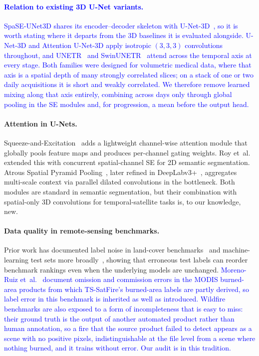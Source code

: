 \documentclass[sensors,article,submit,moreauthors,pdftex]{Definitions/mdpi}
\newcommand{\rev}[1]{\textcolor{blue}{#1}}
\begin{document}
\paragraph*{\rev{Relation to existing 3D U-Net variants.}} \rev{SpaSE-UNet3D
shares its encoder--decoder skeleton with U-Net-3D~\cite{cciccek20163d}, so it is
worth stating where it departs from the 3D baselines it is evaluated alongside.
U-Net-3D and Attention U-Net-3D apply isotropic $(3,3,3)$ convolutions
throughout, and UNETR~\cite{hatamizadeh2022unetr} and
SwinUNETR~\cite{hatamizadeh2022swin} attend across the temporal axis at every
stage. Both families were designed for volumetric medical data, where that axis
is a spatial depth of many strongly correlated slices; on a stack of one or two
daily acquisitions it is short and weakly correlated. We therefore remove learned
mixing along that axis entirely, combining across days only through global
pooling in the SE modules and, for progression, a mean before the output head.}

\paragraph*{Attention in U-Nets.} Squeeze-and-Excitation~\cite{hu2018squeeze} adds a lightweight channel-wise attention module that globally pools feature maps and produces per-channel gating weights. Roy et~al.~\cite{roy2018concurrent} extended this with concurrent spatial-channel SE for 2D semantic segmentation. Atrous Spatial Pyramid Pooling~\cite{chen2017rethinking}, later refined in DeepLabv3+~\cite{chen2018encoder}, aggregates multi-scale context via parallel dilated convolutions in the bottleneck. Both modules are standard in semantic segmentation, but their combination with spatial-only 3D convolutions for temporal-satellite tasks is, to our knowledge, new.

\paragraph*{Data quality in remote-sensing benchmarks.} Prior work has documented label noise in land-cover benchmarks~\cite{pelletier2017assessing} and machine-learning test sets more broadly~\cite{northcutt2021pervasive}, showing that erroneous test labels can reorder benchmark rankings even when the underlying models are unchanged. \rev{Moreno-Ruiz et~al.~\cite{morenoruiz2020modis} document omission and commission errors in the MODIS burned-area products from which TS-SatFire's burned-area labels are partly derived, so label error in this benchmark is inherited as well as introduced. Wildfire benchmarks are also exposed to a form of incompleteness that is easy to miss: their ground truth is the output of another automated product rather than human annotation, so a fire that the source product failed to detect appears as a scene with no positive pixels, indistinguishable at the file level from a scene where nothing burned, and it trains without error. Our audit is in this tradition.}
\end{document}
